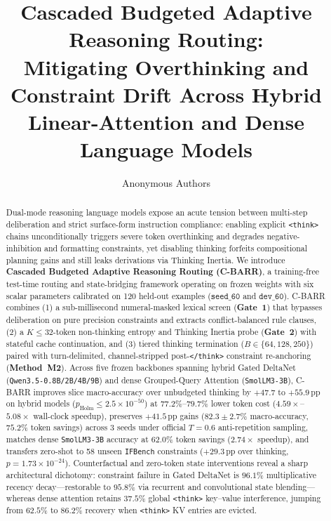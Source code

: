 \documentclass{article}
\title{Cascaded Budgeted Adaptive Reasoning Routing:\\
Mitigating Overthinking and Constraint Drift Across Hybrid Linear-Attention and Dense Language Models}
\author{Anonymous Authors}
\begin{document}
\maketitle

\begin{abstract}
Dual-mode reasoning language models expose an acute tension between multi-step deliberation and strict surface-form instruction compliance: enabling explicit \texttt{<think>} chains unconditionally triggers severe token overthinking and degrades negative-inhibition and formatting constraints, yet disabling thinking forfeits compositional planning gains and still leaks derivations via Thinking Inertia. We introduce \textbf{Cascaded Budgeted Adaptive Reasoning Routing (C-BARR)}, a training-free test-time routing and state-bridging framework operating on frozen weights with six scalar parameters calibrated on 120 held-out examples ($\texttt{seed\_60}$ and $\texttt{dev\_60}$). C-BARR combines (1) a sub-millisecond numeral-masked lexical screen (\textbf{Gate~1}) that bypasses deliberation on pure precision constraints and extracts conflict-balanced rule clauses, (2) a $K \le 32$-token non-thinking entropy and Thinking Inertia probe (\textbf{Gate~2}) with stateful cache continuation, and (3) tiered thinking termination ($B \in \{64, 128, 250\}$) paired with turn-delimited, channel-stripped post-\texttt{</think>} constraint re-anchoring (\textbf{Method~M2}). Across five frozen backbones spanning hybrid Gated DeltaNet (\texttt{Qwen3.5-0.8B/2B/4B/9B}) and dense Grouped-Query Attention (\texttt{SmolLM3-3B}), C-BARR improves slice macro-accuracy over unbudgeted thinking by $+47.7$ to $+55.9$\,pp on hybrid models ($p_{\text{Holm}} \le 2.5 \times 10^{-50}$) at $77.2\%$--$79.7\%$ lower token cost ($4.59\times$--$5.08\times$ wall-clock speedup), preserves $+41.5$\,pp gains ($82.3 \pm 2.7\%$ macro-accuracy, $75.2\%$ token savings) across 3 seeds under official $T=0.6$ anti-repetition sampling, matches dense \texttt{SmolLM3-3B} accuracy at $62.0\%$ token savings ($2.74\times$ speedup), and transfers zero-shot to 58 unseen \texttt{IFBench} constraints ($+29.3$\,pp over thinking, $p = 1.73 \times 10^{-24}$). Counterfactual and zero-token state interventions reveal a sharp architectural dichotomy: constraint failure in Gated DeltaNet is $96.1\%$ multiplicative recency decay---restorable to $95.8\%$ via recurrent and convolutional state blending---whereas dense attention retains $37.5\%$ global \texttt{<think>} key--value interference, jumping from $62.5\%$ to $86.2\%$ recovery when \texttt{<think>} KV entries are evicted.
\end{abstract}
\end{document}
